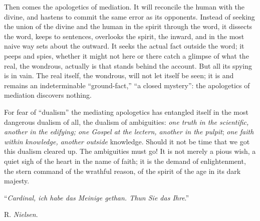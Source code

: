 \documentclass[12pt,a4paper,openany]{book}
\newcommand{\opage}[1]{\marginnote{\footnotesize\textit{[#1]}}}
\newcommand{\signature}[1]{\par\smallskip\hfill #1\hspace*{2em}\par}
\begin{document}
\setcounter{footnote}{0}%
\opage{324}Then comes the apologetics of mediation. It will reconcile
the human with the divine, and hastens
to commit the same error as its opponents.
Instead of seeking the union of the divine and
the human in the spirit through the word, it dissects
the word, keeps to sentences, overlooks the spirit,
the inward, and in the most naive way sets
about the outward. It seeks the actual
fact outside the word; it peeps and spies,
whether it might not here or there catch a glimpse of what the
real, the wondrous, actually is that stands behind
the account. But all its spying is in vain.
The real itself, the wondrous, will not let itself
be seen; it is and remains an indeterminable ``ground-fact,''
``a closed mystery'': the apologetics of mediation
discovers nothing.

For fear of ``dualism'' the mediating apologetics
has entangled itself in the most dangerous dualism of all, the dualism
of ambiguities: \emph{one truth in the scientific,
another in the edifying; one Gospel
at the lectern, another in the pulpit};
\emph{one faith within knowledge, another outside}
knowledge. Should it not be time that we got this
dualism cleared up. The ambiguities must go! It
is not merely a pious wish, a quiet sigh of the heart in the name
of faith; it is the demand of enlightenment, the stern command of the
wrathful reason, of the spirit of the age in its dark majesty.

``\emph{Cardinal, ich habe das Meinige gethan.
Thun Sie das Ihre}.''
\signature{R. \emph{Nielsen}.}
\end{document}
